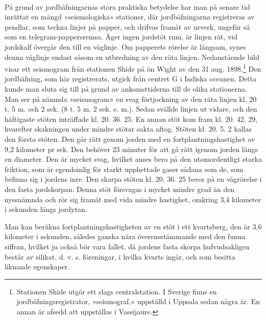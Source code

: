 \documentclass[a4paper, 12pt, oneside, swedish]{article}
\begin{document}
\paragraph{}
På grund av jordbäfningarnas stora praktiska betydelse har man på senare tid inrättat en mängd »seismologiska» stationer, där jordbäfningarna registreras av pendlar, som teckna linjer på papper, och drifvas framåt av urverk, ungefär så som en telegram-pappersremsa. Äger ingen jordstöt rum, är linjen rät, vid jordskalf övergår den till en våglinje. Om papperets rörelse är långsam, synes denna våglinje endast såsom en utbredning av den räta linjen. Nedanstående bild visar ett seismogram från stationen Shide på ön Wight av den 31 aug. 1898.\footnote{Stationen Shide utgör ett slags centralstation. I Sverige finns en jordbäfningsregistrator, »seismograf,» uppställd i Uppsala sedan några år. En annan är afsedd att uppställas i Vassijaure.} Den jordbäfning, som här registrerats, utgick från centret G i Indiska oceanen. Detta kunde man sluta sig till på grund av ankomsttiderna till de olika stationerna. Man ser på nämnda »seismogram» en svag förtjockning av den räta linjen kl. 20 t. 5 m. och 2 sek. (8 t. 5 m. 2 sek. e. m.). Sedan svällde linjen ut vidare, och den häftigaste stöten inträffade kl. 20. 36. 25. En annan stöt kom fram kl. 20. 42. 29, hvarefter skakningen under mindre stötar sakta aftog. Stöten kl. 20. 5. 2 kallas den första stöten. Den går rätt genom jorden med en fortplantningshastighet av 9,2 kilometer pr sek. Den behöver 23 minuter för att gå rätt igenom jorden längs en diameter. Den är mycket svag, hvilket anses bero på den utomordentligt starka friktion, som är egendomlig för starkt upphettade gaser sådana som de, som befinna sig i jordens inre. Den skarpa stöten kl. 20. 36. 25 beror på en vågrörelse i den fasta jordskorpan. Denna stöt försvagas i mycket mindre grad än den nyssnämnda och rör sig framåt med vida mindre hastighet, omkring 3,4 kilometer i sekunden längs jordytan.

Man kan beräkna fortplantningshastigheten av en stöt i ett kvartsberg, den är 3,6 kilometer i sekunden, således ganska nära överensstämmande med den funna siffran, hvilket ju också bör vara fallet, då jordens fasta skorpa hufvudsakligen består av silikat, d. v. s. föreningar, i hvilka kvarts ingår, och som besitta liknande egenskaper.
\end{document}
